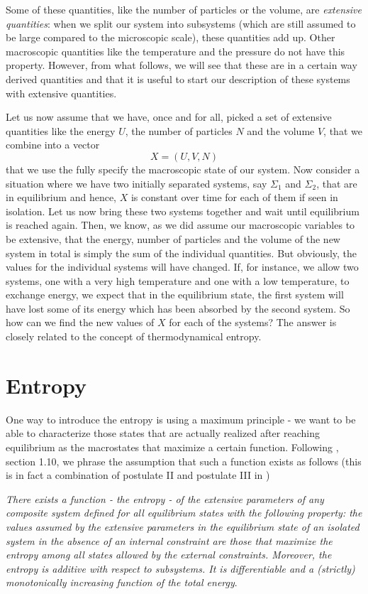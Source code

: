 \documentclass[a4paper, draft]{report}
\numberwithin{section}{chapter}
\numberwithin{equation}{chapter}
\theoremstyle{own}
\theoremstyle{remark}
\begin{document}
Some of these quantities, like the number of particles or the volume, are {\em extensive quantities}: when we split our system into subsystems (which are still assumed to be large compared to the microscopic scale), these quantities add up. Other macroscopic quantities like the temperature and the pressure do not have this property. However, from what follows, we will see that these are in a certain way derived quantities and that it is useful to start our description of these systems with extensive quantities.

Let us now assume that we have, once and for all, picked a set of extensive quantities like the energy $U$, the number of particles $N$ and the volume $V$, that we combine into a vector
$$
X = (U,V,N)
$$
that we use the fully specify the macroscopic state of our system. Now consider a situation where we have two initially separated systems, say $\Sigma_1$ and $\Sigma_2$, that are in equilibrium and hence, $X$ is constant over time for each of them if seen in isolation. Let us now bring these two systems together and wait until equilibrium is reached again. Then, we know, as we did assume our macroscopic variables to be extensive, that the energy, number of particles and the volume of the new system in total is simply the sum of the individual quantities. But obviously, the values for the individual systems will have changed. If, for instance, we allow two systems, one with a very high temperature and one with a low temperature, to exchange energy, we expect that in the equilibrium state, the first system will have lost some of its energy which has been absorbed by the second system. So how can we find the new values of $X$ for each of the systems? The answer is closely related to the concept of thermodynamical entropy.

\section{Entropy}

One way to introduce the entropy is using a maximum principle - we want to be able to characterize those states that are actually realized after reaching equilibrium as the macrostates that maximize a certain function. Following 
\cite{Callen}, section 1.10, we phrase the assumption that such a function exists as follows (this is in fact a combination of postulate II and postulate III in \cite{Callen})

{\em There exists a function - the entropy - of the extensive parameters of any composite system defined for all equilibrium states with the following property: the values assumed by the extensive parameters in the equilibrium state of an isolated system in the absence of an internal constraint are those that maximize the entropy among all states allowed by the external constraints. Moreover, the entropy is additive with respect to subsystems. It is differentiable and a (strictly) monotonically increasing function of the total energy}.
	
\end{document}
